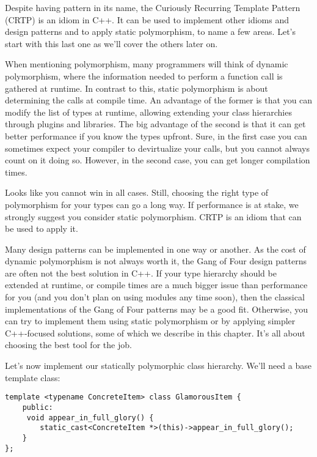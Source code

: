 
Despite having pattern in its name, the Curiously Recurring Template Pattern (CRTP) is an idiom in C++. It can be used to implement other idioms and design patterns and to apply  static polymorphism, to name a few areas. Let's start with this last one as we'll cover the others later on.


When mentioning polymorphism, many programmers will think of dynamic polymorphism, where the information needed to perform a function call is gathered at runtime. In contrast to this, static polymorphism is about determining the calls at compile time. An advantage of the former is that you can modify the list of types at runtime, allowing extending your class hierarchies through plugins and libraries. The big advantage of the second is that it can get better performance if you know the types upfront. Sure, in the first case you can sometimes expect your compiler to devirtualize your calls, but you cannot always count on it doing so. However, in the second case, you can get longer compilation times.

Looks like you cannot win in all cases. Still, choosing the right type of polymorphism for your types can go a long way. If performance is at stake, we strongly suggest you consider static polymorphism. CRTP is an idiom that can be used to apply it.

Many design patterns can be implemented in one way or another. As the cost of dynamic polymorphism is not always worth it, the Gang of Four design patterns are often not the best solution in C++. If your type hierarchy should be extended at runtime, or compile times are a much bigger issue than performance for you (and you don't plan on using modules any time soon), then the classical implementations of the Gang of Four patterns may be a good fit. Otherwise, you can try to implement them using static polymorphism or by applying simpler C++-focused solutions, some of which we describe in this chapter. It's all about choosing the best tool for the job.


Let's now implement our statically polymorphic class hierarchy. We'll need a base template class:

\begin{lstlisting}[style=styleCXX]
template <typename ConcreteItem> class GlamorousItem {
	public:
	 void appear_in_full_glory() {
		static_cast<ConcreteItem *>(this)->appear_in_full_glory();
	}
};
\end{lstlisting}

